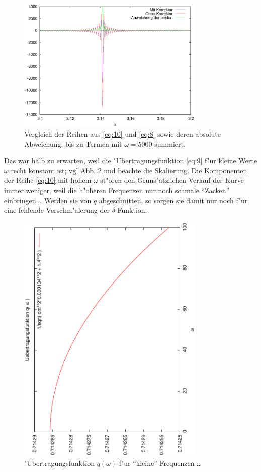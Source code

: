 \documentclass[a4paper,12pt]{article}
\begin{document}
\begin{figure}
  \centering
  \includegraphics[width=0.8\textwidth]{vgl2}
  \caption{Vergleich der Reihen aus \eqref{eq:10} und \eqref{eq:8}
    sowie deren absolute Abweichung; bis zu Termen mit $\omega = 5000$
  summiert.}
  \label{fig:vgl2}
\end{figure}



Das war halb zu erwarten, weil die "Ubertragungsfunktion \eqref{eq:9}
f"ur kleine Werte $\omega$ recht konstant ist; vgl Abb. \ref{fig:uebertr}
und beachte die Skalierung. Die Komponenten der Reihe \eqref{eq:10}
mit hohem $\omega$ st"oren den Gruns"atzlichen Verlauf der Kurve immer
weniger, weil die h"oheren Frequenzen nur noch schmale "`Zacken"'
einbringen... Werden sie von $q$ abgeschnitten, so sorgen sie damit
nur noch f"ur eine fehlende Verschm"alerung der $\delta$-Funktion.

\begin{figure}
  \centering
  \includegraphics[width=0.8\textwidth,height=0.4\textheight]{uebertr}
  \caption{"Ubertragungsfunktion $q(\omega)$ f"ur "`kleine"' Frequenzen $\omega$}
  \label{fig:uebertr}
\end{figure}
 
\end{document}
